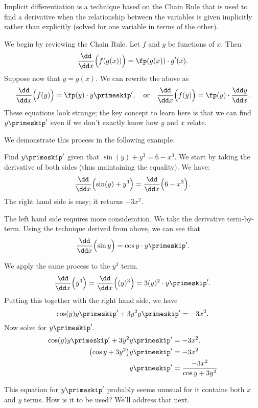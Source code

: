 Implicit differentiation is a technique based on the Chain Rule that is used to find a derivative when the relationship between the variables is given implicitly rather than explicitly (solved for one variable in terms of the other).\bigskip

We begin by reviewing the Chain Rule. Let $f$ and $g$ be functions of $x$. Then
\[\frac{\dd}{\dd x}\Bigl(f(g(x))\Bigr) = \fp(g(x))\cdot g'(x).\]
Suppose now that $y=g(x)$. We can rewrite the above as
\begin{equation}
\frac{\dd}{\dd x}\Bigl(f(y)\Bigr) = \fp(y)\cdot y\primeskip', \quad \text{or}\quad
\frac{\dd}{\dd x}\Bigl(f(y)\Bigr) = \fp(y)\cdot \frac{\dd y}{\dd x} .\label{eq:implicit1}
\end{equation}
These equations look strange; the key concept to learn here is that we can find $y\primeskip'$ even if we don't exactly know how $y$ and $x$ relate.


We demonstrate this process in the following example.

\begin{example}\label{ex_implicit1}
Find $y\primeskip'$ given that $\sin(y) + y^3=6-x^3$.
\solution
We start by taking the derivative of both sides (thus maintaining the equality). We have:
\[\frac{\dd}{\dd x}\Bigl(\sin(y) + y^3\Bigr)=\frac{\dd}{\dd x}\Bigl(6-x^3\Bigr).\]
The right hand side is easy; it returns $-3x^2$. 

The left hand side requires more consideration. We take the derivative term-by-term.  Using the technique derived from  above, we can see that
\vspace{-.3\baselineskip}
\[\frac{\dd}{\dd x}\Bigl(\sin y\Bigr) = \cos y \cdot y\primeskip'.\] %

We apply the same process to the $y^3$ term. 
\[
\frac{\dd}{\dd x}\Bigl(y^3\Bigr) = \frac{\dd}{\dd x}\Bigl((y)^3\Bigr) = 3(y)^2\cdot y\primeskip'.
\]
Putting this together with the right hand side, we have
\[\cos(y)y\primeskip'+3y^2y\primeskip' = -3x^2.\]
Now solve for $y\primeskip'$.\vspace{-.5\baselineskip}
\begin{align*}
	\cos(y)y\primeskip'+3y^2y\primeskip' 	&= -3x^2.\\
	\bigl(\cos y+3y^2\bigr)y\primeskip' &=	-3x^2\\
	y\primeskip'&=	\frac{-3x^2}{\cos y+3y^2}
\end{align*}

This equation for $y\primeskip'$ probably seems unusual for it contains both $x$ and $y$ terms. How is it to be used? We'll address that next.
\end{example}

